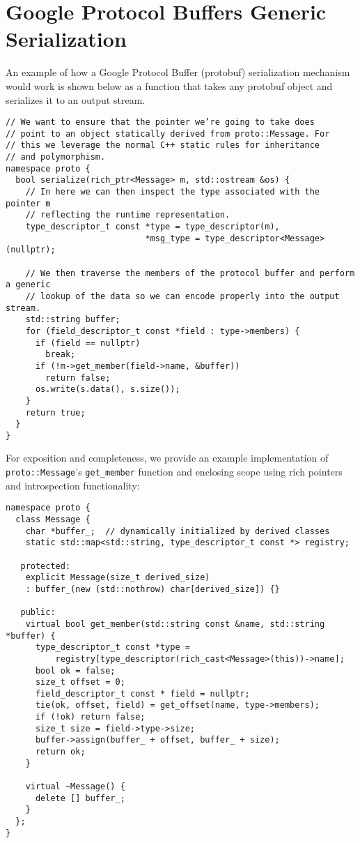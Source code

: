 \section{Google Protocol Buffers Generic Serialization}
\label{appendix:protobuf-example}
An example of how a Google Protocol Buffer (protobuf) serialization mechanism
would work is shown below as a function that takes any protobuf object and
serializes it to an output stream.

\begin{verbatim}
// We want to ensure that the pointer we’re going to take does
// point to an object statically derived from proto::Message. For
// this we leverage the normal C++ static rules for inheritance
// and polymorphism.
namespace proto {
  bool serialize(rich_ptr<Message> m, std::ostream &os) {
    // In here we can then inspect the type associated with the pointer m
    // reflecting the runtime representation.
    type_descriptor_t const *type = type_descriptor(m),
                            *msg_type = type_descriptor<Message>(nullptr);

    // We then traverse the members of the protocol buffer and perform a generic
    // lookup of the data so we can encode properly into the output stream.
    std::string buffer;
    for (field_descriptor_t const *field : type->members) {
      if (field == nullptr)
        break;
      if (!m->get_member(field->name, &buffer))
        return false;
      os.write(s.data(), s.size());
    }
    return true;
  }
}
\end{verbatim}

For exposition and completeness, we provide an example implementation of
\verb+proto::Message+’s \verb+get_member+ function and enclosing scope using
rich pointers and introspection functionality:

\begin{verbatim}
namespace proto {
  class Message {
    char *buffer_;  // dynamically initialized by derived classes
    static std::map<std::string, type_descriptor_t const *> registry;

   protected:
    explicit Message(size_t derived_size)
    : buffer_(new (std::nothrow) char[derived_size]) {}

   public:
    virtual bool get_member(std::string const &name, std::string *buffer) {
      type_descriptor_t const *type =
          registry[type_descriptor(rich_cast<Message>(this))->name];
      bool ok = false;
      size_t offset = 0;
      field_descriptor_t const * field = nullptr;
      tie(ok, offset, field) = get_offset(name, type->members);
      if (!ok) return false;
      size_t size = field->type->size;
      buffer->assign(buffer_ + offset, buffer_ + size);
      return ok;
    }

    virtual ~Message() {
      delete [] buffer_;
    }
  };
}
\end{verbatim}


